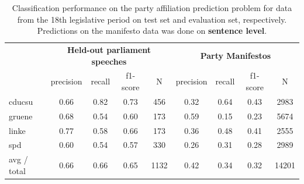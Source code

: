 \documentclass{article}
\begin{document}
\begin{table}[t]
\caption{
\label{tab:results_18}
Classification performance on the party affiliation prediction problem for data from the 18th legislative period on test set and evaluation set, respectively.  Predictions on the manifesto data was done on {\bf sentence level}.
}
\begin{center}
\begin{tabular}{lcccccccc}
& \multicolumn{4}{c}{\bf Held-out parliament speeches} & \multicolumn{4}{c}{\bf Party Manifestos}\\
    &         precision    &recall &  f1-score  & N    &         precision    &recall &  f1-score  & N\\
\hline \hline
    cducsu    &   0.66   &   0.82   &   0.73    &   456 & 0.32  &    0.64  &    0.43    &  2983\\
     gruene   &    0.68    &  0.54   &   0.60    &   173   &0.59   &   0.15   &   0.23   &   5674\\
      linke     &  0.77  &    0.58    &  0.66    &   173 & 0.36   &   0.48   &   0.41   &   2555\\
        spd     &  0.60  &    0.54   &   0.57    &   330 & 0.26 &     0.31   &   0.28     & 2989\\
\hline
avg / total    &   0.66  &    0.66  &    0.65   &   1132&  0.42 &     0.34  &    0.32&     14201\\
%
\end{tabular}
\end{center}

\end{table}
\end{document}
